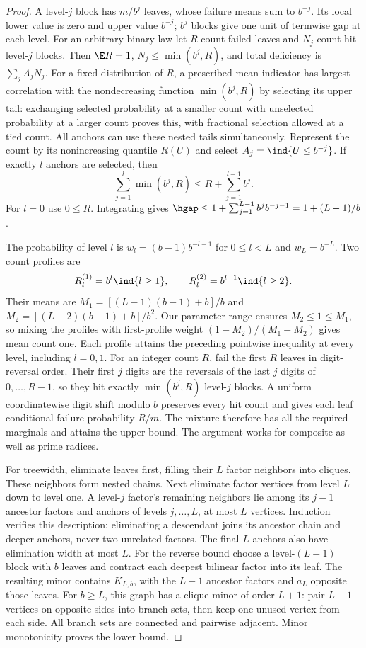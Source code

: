 \begin{proof}
A level-$j$ block has $m/b^j$ leaves, whose failure means sum to $b^{-j}$.
Its local lower value is zero and upper value $b^{-j}$; $b^j$ blocks give
one unit of termwise gap at each level. For an arbitrary binary law let
$R$ count failed leaves and $N_j$ count hit level-$j$ blocks. Then
$\E R=1$, $N_j\le\min(b^j,R)$, and total deficiency is
$\sum_j A_jN_j$. For a fixed distribution of $R$, a prescribed-mean
indicator has largest correlation with the nondecreasing function
$\min(b^j,R)$ by selecting its upper tail: exchanging selected probability
at a smaller count with unselected probability at a larger count proves
this, with fractional selection allowed at a tied count. All
anchors can use these nested tails simultaneously. Represent the count by
its nonincreasing quantile $R(U)$ and select $A_j=\ind\{U\le b^{-j}\}$.
If exactly $l$ anchors are selected, then
\[
 \sum_{j=1}^l\min(b^j,R)\le R+\sum_{j=1}^{l-1}b^j.
\]
For $l=0$ use $0\le R$. Integrating gives
$\hgap\le1+\sum_{j=1}^{L-1}b^j b^{-j-1}=1+(L-1)/b$.

The probability of level $l$ is $w_l=(b-1)b^{-l-1}$ for $0\le l<L$
and $w_L=b^{-L}$. Two count profiles are
\[
 R_l^{(1)}=b^l\ind\{l\ge1\},\qquad
 R_l^{(2)}=b^{l-1}\ind\{l\ge2\}.
\]
Their means are $M_1=[(L-1)(b-1)+b]/b$ and
$M_2=[(L-2)(b-1)+b]/b^2$. Our parameter range ensures
$M_2\le1\le M_1$, so mixing the profiles with first-profile weight
$(1-M_2)/(M_1-M_2)$ gives mean count one. Each profile attains the
preceding pointwise inequality at every level, including $l=0,1$.
For an integer count $R$, fail the first $R$ leaves in digit-reversal
order. Their first $j$ digits are the reversals of the last $j$ digits of
$0,\ldots,R-1$, so they hit exactly $\min(b^j,R)$ level-$j$ blocks.
A uniform coordinatewise digit shift modulo $b$ preserves every hit count
and gives each leaf conditional failure probability $R/m$. The mixture
therefore has all the required marginals and attains the upper bound.
The argument works for composite as well as prime radices.

For treewidth, eliminate leaves first, filling their $L$ factor neighbors
into cliques. These neighbors form nested chains. Next eliminate factor
vertices from level $L$ down to level one. A level-$j$ factor's remaining
neighbors lie among its $j-1$ ancestor factors and anchors of levels
$j,\ldots,L$, at most $L$ vertices. Induction verifies this description:
eliminating a descendant joins its ancestor chain and deeper anchors,
never two unrelated factors. The final $L$ anchors also have elimination
width at most $L$. For the reverse bound choose a level-$(L-1)$ block
with $b$ leaves and contract each deepest bilinear factor into its leaf.
The resulting minor contains $K_{L,b}$, with the $L-1$ ancestor factors
and $a_L$ opposite those leaves. For $b\ge L$, this graph has a clique
minor of order $L+1$: pair $L-1$ vertices on opposite sides into branch
sets, then keep one unused vertex from each side. All branch sets are
connected and pairwise adjacent. Minor monotonicity proves the lower bound.
\end{proof}

